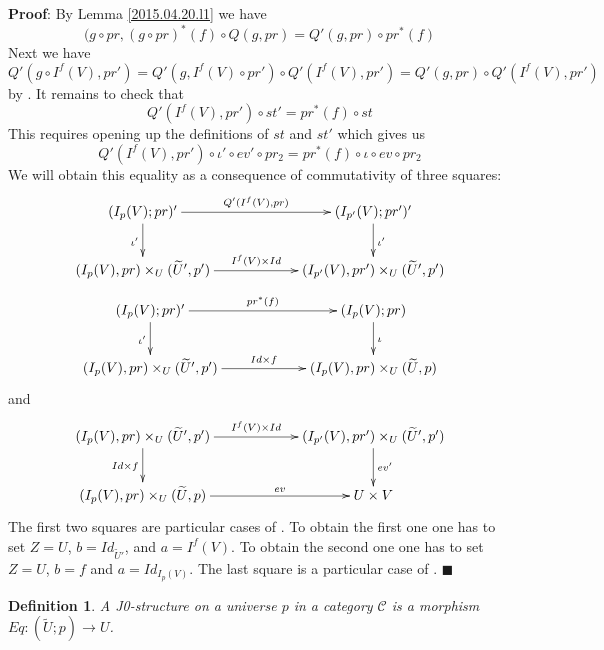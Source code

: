 \documentclass[12pt]{article}
\numberwithin{equation}{section}
\newenvironment{myproof}{{\bf Proof}:}{$\blacksquare$ \vskip 5mm }
\newtheorem{definition}[proposition]{Definition}
\newcommand{\llabel}[1]{\label{#1}}
\newcommand{\sr}{\rightarrow}
\newcommand{\wt}{\widetilde}
\begin{document}
\begin{myproof}
By Lemma \ref{2015.04.20.l1} we have
%
$$(g\circ pr, (g\circ pr)^*(f)\circ Q(g,pr)=Q'(g,pr)\circ pr^*(f)$$
%
Next we have
%
$$Q'(g\circ I^f(V), pr')=Q'(g,I^f(V)\circ pr')\circ
Q'(I^f(V),pr')=Q'(g,pr)\circ Q'(I^f(V),pr')$$
%
by \cite[Lemma 3.2]{fromunivwithPi}. It remains to check that
%
$$Q'(I^f(V),pr')\circ st'=pr^*(f)\circ st$$
%
This requires opening up the definitions of $st$ and $st'$ which gives us
%
$$Q'(I^f(V),pr')\circ \iota'\circ ev'\circ pr_2=pr^*(f)\circ \iota\circ ev\circ
pr_2$$
%
We will obtain this equality as a consequence of commutativity of three
squares:
%
$$
\begin{xy}
          \xymatrix@C=5pc{ (I_p(V);pr)' \ar[r]^-{Q'(I^f(V),pr)} \ar[d]_{\iota'}
            & (I_{p'}(V);pr')'
            \ar[d]^{\iota'}\\ (I_p(V),pr)\times_U(\wt{U}',p')
            \ar[r]^-{I^f(V)\times Id} & (I_{p'}(V),pr')\times_U(\wt{U}',p') }
\end{xy}
$$
%
$$
\begin{xy}
          \xymatrix@C=5pc{ (I_p(V);pr)' \ar[r]^-{pr^*(f)} \ar[d]_{\iota'} &
            (I_{p}(V);pr) \ar[d]^{\iota}\\ (I_p(V),pr)\times_U(\wt{U}',p')
            \ar[r]^-{Id\times f} & (I_{p}(V),pr)\times_U(\wt{U},p) }
\end{xy}
$$
%
and
%
$$
\begin{xy}
          \xymatrix@C=5pc{ (I_p(V),pr)\times_U(\wt{U}',p')
            \ar[r]^-{I^f(V)\times Id} \ar[d]_{Id\times f} &
            (I_{p'}(V),pr')\times_U(\wt{U}',p')
            \ar[d]^{ev'}\\ (I_p(V),pr)\times_U(\wt{U},p) \ar[r]^-{ev} & U\times
            V }
\end{xy}
$$
%
The first two squares are particular cases of \cite[Lemma
  8.1]{fromunivwithPi}. To obtain the first one one has to set $Z=U$,
$b=Id_{\wt{U}'}$, and $a=I^f(V)$. To obtain the second one one has to set
$Z=U$, $b=f$ and $a=Id_{I_p(V)}$. The last square is a particular case of
\cite[Lemma 8.6]{fromunivwithPi}.
%
\end{myproof}
%
\begin{definition}
\llabel{2015.03.27.def4} A J0-structure on a universe $p$ in a category
$\mathcal C$ is a morphism $Eq:(\wt{U};p)\sr U$.
\end{definition}
%
\end{document}

